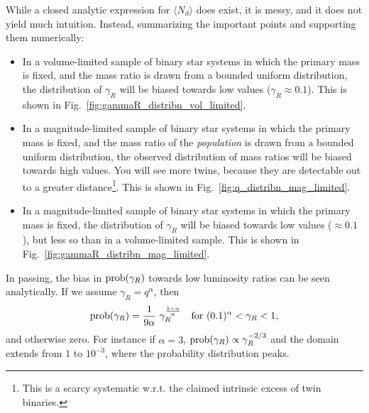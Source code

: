 \documentclass{emulateapj}
\begin{document}
While a closed analytic expression for $\langle N_d \rangle$ does exist, it is 
messy, and it does not yield much intuition. Instead, summarizing the important 
points and supporting them numerically:
\begin{itemize}
	\item In a volume-limited sample of binary star systems in which the 
	primary mass is fixed, and the mass ratio is drawn from a bounded uniform 
	distribution, the distribution of $\gamma_R$ will be biased towards low 
	values ($\gamma_R \approx 0.1$). This is shown in 
	Fig.~\ref{fig:gammaR_distribn_vol_limited}.
	\item In a magnitude-limited sample of binary star systems in which the 
	primary mass is fixed, and the mass ratio of the \textit{population} is 
	drawn from a bounded uniform distribution, the observed distribution of 
	mass ratios will be biased towards high values. You will see more twins,
	because they are detectable out to a greater distance\footnote{This is a 
	scarcy systematic w.r.t. the claimed intrinsic excess of twin binaries.}. 
	This is shown in 
	Fig.~\ref{fig:q_distribn_mag_limited}.
	\item In a magnitude-limited sample of binary star systems in which the 
	primary mass is fixed, the distribution of $\gamma_R$ will be biased 
	towards low values ($\approx 0.1$), but less so than in a 
	volume-limited sample. This is shown in 
	Fig.~\ref{fig:gammaR_distribn_mag_limited}.
\end{itemize}

In passing, the bias in ${\rm prob}(\gamma_R)$ towards low luminosity ratios 
can be seen analytically. If we assume $\gamma_R = q^\alpha$, then
\begin{equation}
{\rm prob}(\gamma_R) = \frac{1}{9 \alpha} \ \gamma_R^{\frac{1-\alpha}{\alpha}}
\quad {\rm for\ } (0.1)^\alpha < \gamma_R < 1,
\end{equation}
and otherwise zero. For instance if $\alpha = 3$, ${\rm prob}(\gamma_R) 
\propto \gamma_R^{-2/3}$ and the domain extends from $1$ to 
$10^{-3}$, where the probability distribution peaks.
\end{document}
